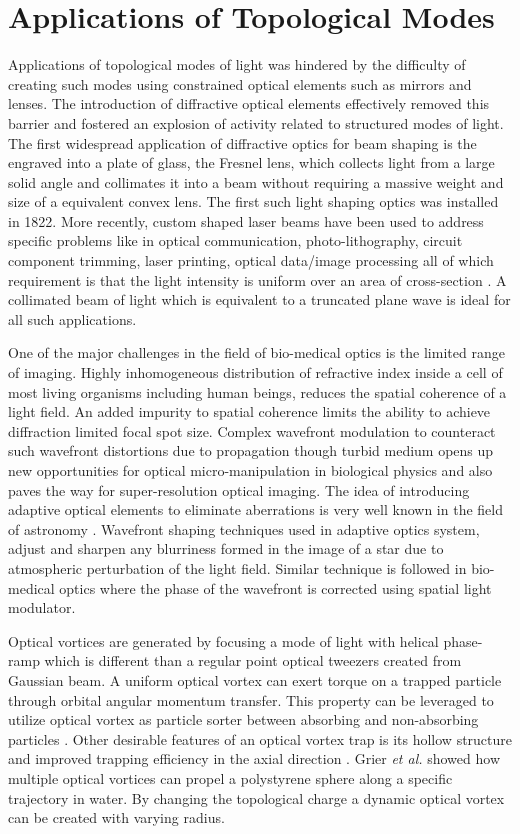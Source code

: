 \section{Applications of Topological Modes}

Applications of topological modes of light was hindered by the difficulty of creating such modes using constrained optical elements such as mirrors and lenses. The introduction of diffractive optical elements effectively removed this barrier and fostered an explosion of activity related to structured modes of light. The first widespread application of diffractive optics for beam shaping is the engraved into a plate of glass, the Fresnel lens, which collects light from a large solid angle and collimates it into a beam without requiring a massive weight and size of a equivalent convex lens. The first such light shaping optics was installed in 1822. More recently, custom shaped laser beams have been used to address specific problems like in optical communication, photo-lithography, circuit component trimming, laser printing, optical data/image processing all of which requirement is that the light intensity is uniform over an area of cross-section \cite{Dickey03}. A collimated beam of light which is equivalent to a truncated plane wave is ideal for all such applications. 

One of the major challenges in the field of bio-medical optics is the limited range of imaging. Highly inhomogeneous distribution of refractive index inside a cell of most living organisms including human beings, reduces the spatial coherence of a light field. An added impurity to spatial coherence limits the ability to achieve diffraction limited focal spot size. Complex wavefront modulation to counteract such wavefront distortions due to propagation though turbid medium opens up new opportunities for optical micro-manipulation in biological physics and also paves the way for super-resolution optical imaging. The idea of introducing adaptive optical elements to eliminate aberrations is very well known in the field of astronomy \cite{Beuzit1997, beuzit1994}. Wavefront shaping techniques used in adaptive optics system, adjust and sharpen any blurriness formed in the image of a star due to atmospheric perturbation of the light field. Similar technique is followed in bio-medical optics where the phase of the wavefront is corrected using spatial light modulator.

Optical vortices are generated by focusing a mode of light with helical phase-ramp which is different than a regular point optical tweezers created from Gaussian beam. A uniform optical vortex can exert torque on a trapped particle through orbital angular momentum transfer. This property can be leveraged to utilize optical vortex as particle sorter between absorbing and non-absorbing particles \cite{ONEIL2000139, Parkin:06, chavez2003}. Other desirable features of an optical vortex trap is its hollow structure and improved trapping efficiency in the axial direction \cite{NIEMINEN2008195}. Grier \emph{et al.} \cite{Curtis:03}  showed how multiple optical vortices can propel a polystyrene sphere along a specific trajectory in water. By changing the topological charge a dynamic optical vortex can be created with varying radius. 

